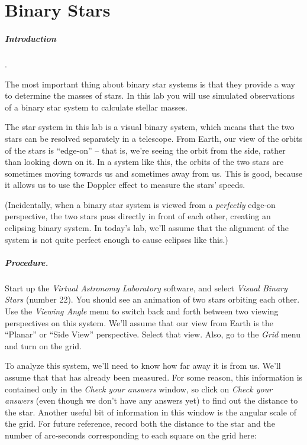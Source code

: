 \chapter{Binary Stars}


\paragraph{Introduction}.

The most important thing about binary star systems is that they provide
a way to determine the masses of stars.  In this lab you will use
simulated observations of a binary star system to calculate stellar
masses.

The star system in this lab is a visual binary system, which means that
the two stars can be resolved separately in a telescope.  From Earth,
our view of the orbits of the stars is ``edge-on'' -- that is, we're seeing
the orbit from the side, rather than looking down on it.  In a system
like this, the orbits of the two stars are sometimes moving towards
us and sometimes away from us.  This is good, because it allows us
to use the Doppler effect to measure the stars' speeds.

(Incidentally, when a binary star system is viewed from a {\it perfectly}
edge-on perspective, the two stars pass directly in front of each other,
creating an eclipsing binary system.  In today's lab, we'll assume that
the alignment of the system is not quite perfect enough to cause eclipses
like this.)


\paragraph{Procedure.}

Start up the {\it Virtual Astronomy Laboratory} software, and select
{\it Visual Binary Stars} (number 22).  You should see an animation
of two stars orbiting each other.  Use the {\it Viewing Angle}
menu to switch back and forth between two viewing perspectives
on this system.  We'll assume that our view from Earth is the ``Planar''
or ``Side View'' perspective.  Select that view.  Also, go to
the {\it Grid} menu and turn on the grid.

To analyze this system, we'll need to know how far away it is from us.
We'll assume that that has already been measured.  For some reason,
this information is contained only in the {\it Check your answers}
window, so click on {\it Check your answers} (even though we don't have any
answers yet) to find out the distance to the star.  Another useful
bit of information in this window is the angular scale of the grid.  For
future reference, record both the distance to the star and the
number of arc-seconds corresponding to each square on the grid here:

